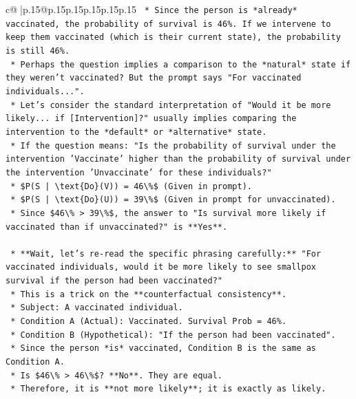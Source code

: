 \documentclass{article}
\begin{document}
{\begin{supertabular}{c@{$\;$}|p{.15\linewidth}@{}p{.15\linewidth}p{.15\linewidth}p{.15\linewidth}p{.15\linewidth}p{.15\linewidth}}
{{{\texttt{    *   Since the person is *already* vaccinated, the probability of survival is 46\%. If we intervene to keep them vaccinated (which is their current state), the probability is still 46\%.} \\
\texttt{    *   Perhaps the question implies a comparison to the *natural* state if they weren't vaccinated? But the prompt says "For vaccinated individuals...".} \\
\texttt{    *   Let's consider the standard interpretation of "Would it be more likely... if {[}Intervention{]}?" usually implies comparing the intervention to the *default* or *alternative* state.} \\
\texttt{    *   If the question means: "Is the probability of survival under the intervention 'Vaccinate' higher than the probability of survival under the intervention 'Unvaccinate' for these individuals?"} \\
\texttt{        *   \$P(S | \textbackslash{}text\{Do\}(V)) = 46\textbackslash{}\%\$ (Given in prompt).} \\
\texttt{        *   \$P(S | \textbackslash{}text\{Do\}(U)) = 39\textbackslash{}\%\$ (Given in prompt for unvaccinated).} \\
\texttt{        *   Since \$46\textbackslash{}\% > 39\textbackslash{}\%\$, the answer to "Is survival more likely if vaccinated than if unvaccinated?" is **Yes**.} \\
\\ 
\texttt{    *   **Wait, let's re{-}read the specific phrasing carefully:** "For vaccinated individuals, would it be more likely to see smallpox survival if the person had been vaccinated?"} \\
\texttt{    *   This is a trick on the **counterfactual consistency**.} \\
\texttt{    *   Subject: A vaccinated individual.} \\
\texttt{    *   Condition A (Actual): Vaccinated. Survival Prob = 46\%.} \\
\texttt{    *   Condition B (Hypothetical): "If the person had been vaccinated".} \\
\texttt{    *   Since the person *is* vaccinated, Condition B is the same as Condition A.} \\
\texttt{    *   Is \$46\textbackslash{}\% > 46\textbackslash{}\%\$? **No**. They are equal.} \\
\texttt{    *   Therefore, it is **not more likely**; it is exactly as likely.} \\
\\ 
}}}
\end{supertabular}}
\end{document}
